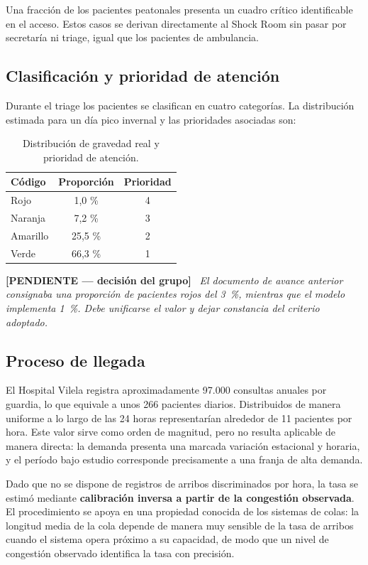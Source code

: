 \documentclass{article}
\newenvironment{pendiente}
  {\par\medskip\noindent\begingroup\color{red!65!black}%
   \textbf{[PENDIENTE — decisión del grupo]}\ \itshape}
  {\endgroup\par\medskip}
\begin{document}
Una fracción de los pacientes peatonales presenta un cuadro crítico
identificable en el acceso. Estos casos se derivan directamente al Shock Room
sin pasar por secretaría ni triage, igual que los pacientes de ambulancia.

\subsection{Clasificación y prioridad de atención}

Durante el triage los pacientes se clasifican en cuatro categorías. La
distribución estimada para un día pico invernal y las prioridades asociadas
son:

\begin{table}[H]
\centering
\begin{tabular}{lcc}
\toprule
\textbf{Código} & \textbf{Proporción} & \textbf{Prioridad} \\
\midrule
Rojo     & 1,0 \%  & 4 \\
Naranja  & 7,2 \%  & 3 \\
Amarillo & 25,5 \% & 2 \\
Verde    & 66,3 \% & 1 \\
\bottomrule
\end{tabular}
\caption{Distribución de gravedad real y prioridad de atención.}
\label{tab:colores}
\end{table}

\begin{pendiente}
El documento de avance anterior consignaba una proporción de pacientes rojos
del 3~\%, mientras que el modelo implementa 1~\%. Debe unificarse el valor y
dejar constancia del criterio adoptado.
\end{pendiente}

\subsection{Proceso de llegada}
\label{sec:arribos}

El Hospital Vilela registra aproximadamente 97.000 consultas anuales por
guardia, lo que equivale a unos 266 pacientes diarios. Distribuidos de manera
uniforme a lo largo de las 24 horas representarían alrededor de 11 pacientes
por hora. Este valor sirve como orden de magnitud, pero no resulta aplicable
de manera directa: la demanda presenta una marcada variación estacional y
horaria, y el período bajo estudio corresponde precisamente a una franja de
alta demanda.

Dado que no se dispone de registros de arribos discriminados por hora, la
tasa se estimó mediante \textbf{calibración inversa a partir de la congestión
observada}. El procedimiento se apoya en una propiedad conocida de los
sistemas de colas: la longitud media de la cola depende de manera muy sensible
de la tasa de arribos cuando el sistema opera próximo a su capacidad, de modo
que un nivel de congestión observado identifica la tasa con precisión.
\end{document}
